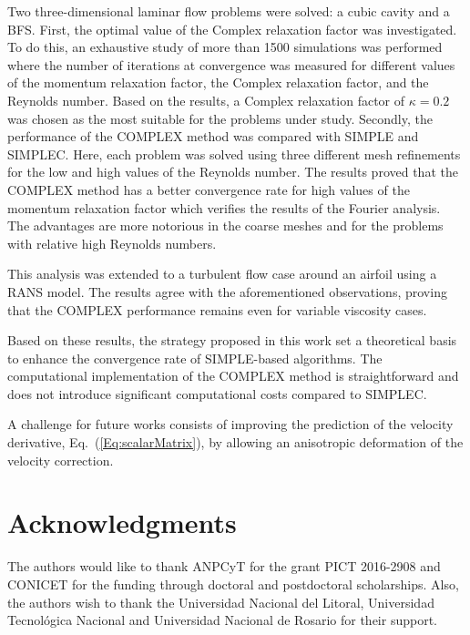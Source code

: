 \documentclass[final,3p,times,11pt,onecolumn]{myElsarticle}
\numberwithin{equation}{section}
\begin{document}
Two three-dimensional laminar flow problems were solved: a cubic cavity and a BFS. First, the optimal value of the Complex relaxation factor was investigated. To do this, an exhaustive study of more than 1500 simulations was performed where the number of iterations at convergence was measured for different values of the momentum relaxation factor, the Complex relaxation factor, and the Reynolds number. Based on the results, a Complex relaxation factor of $\kappa = 0.2$ was chosen as the most suitable for the problems under study. Secondly, the performance of the COMPLEX method was compared with SIMPLE and SIMPLEC. Here, each problem was solved using three different mesh refinements for the low and high values of the Reynolds number. The results proved that the COMPLEX method has a better convergence rate for high values of the momentum relaxation factor which verifies the results of the Fourier analysis. The advantages are more notorious in the coarse meshes and for the problems with relative high Reynolds numbers. %
{
\color{blue}
This analysis was extended to a turbulent flow case around an airfoil using a RANS model. The results agree with the aforementioned observations, proving that the COMPLEX performance remains even for variable viscosity cases.

Based on these results, the strategy proposed in this work set a theoretical basis to enhance the convergence rate of SIMPLE-based algorithms. The computational implementation of the COMPLEX method is straightforward and does not introduce significant computational costs compared to SIMPLEC.} 
A challenge for future works consists of improving the prediction of the velocity derivative, Eq.~(\ref{Eq:scalarMatrix}), by allowing an anisotropic deformation of the velocity correction. %

\nolinenumbers
\section*{Acknowledgments}
The authors would like to thank ANPCyT for the grant PICT 2016-2908 and
CONICET for the funding through doctoral and postdoctoral scholarships. Also, the authors wish to thank the Universidad Nacional del Litoral, Universidad Tecnológica Nacional and Universidad Nacional de Rosario for their support. 



\end{document}
